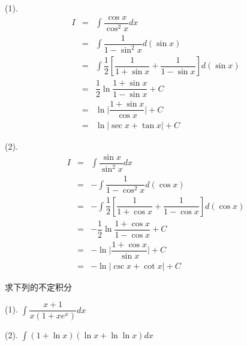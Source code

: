 \begin{solution}

	(1). 
	\begin{eqnarray*}
		I & = & \int \dfrac{\cos x}{\cos ^{2}x}dx\\
		  & = & \int \dfrac{1}{1-\sin^{2}x}d(\sin x)\\
		  & = & \int \dfrac{1}{2}\left[\dfrac{1}{1+\sin x}+\dfrac{1}{1-\sin x}\right]d(\sin x)\\
		  & = & \dfrac{1}{2} \ln \dfrac{1+\sin x}{1-\sin x} +C\\
		  & = & \ln \big|\dfrac{1+\sin x}{\cos x}\big| +C\\
		  & = & \ln \big|\sec x + \tan x\big| +C 
	\end{eqnarray*}

	(2). 
	\begin{eqnarray*}
		I & = & \int \dfrac{\sin x}{\sin ^{2}x}dx\\
		  & = & -\int \dfrac{1}{1-\cos^{2}x}d(\cos x)\\
		  & = & -\int \dfrac{1}{2}\left[\dfrac{1}{1+\cos x}+\dfrac{1}{1-\cos x}\right]d(\cos x)\\
		  & = & -\dfrac{1}{2} \ln \dfrac{1+\cos x}{1-\cos x} +C\\
		  & = & -\ln \big|\dfrac{1+\cos x}{\sin x}\big| +C\\
		  & = & -\ln \big|\csc x + \cot x\big| +C 
	\end{eqnarray*}

\end{solution}

\begin{example}[][Exam: 28.2.6]
	求下列的不定积分

(1). $\int \dfrac{x+1}{x(1+xe^{x})}dx$

(2). $\int (1+\ln x)(\ln x+\ln\ln x)dx$
\end{example}

